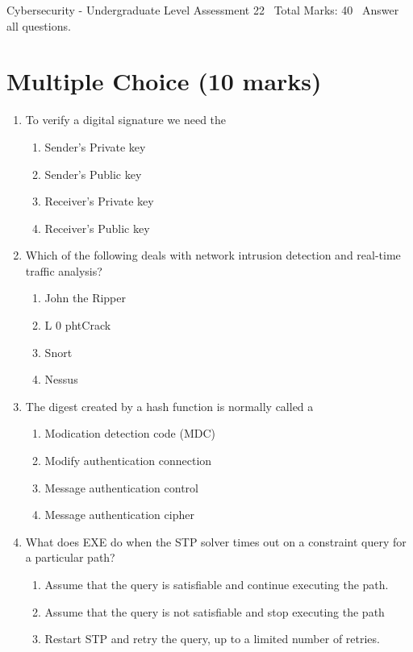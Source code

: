 \documentclass[12pt]{article}
\begin{document}
\begin{center}
Cybersecurity - Undergraduate Level Assessment 22 \
Total Marks: 40 \
Answer all questions.
\end{center}

\section*{Multiple Choice (10 marks)}
\begin{enumerate}[label=\arabic*.]
\item To verify a digital signature we need the
\begin{enumerate}[label=(\alph*)]
    \item Sender's Private key
    \item Sender's Public key
    \item Receiver's Private key
    \item Receiver's Public key
\end{enumerate}
\item Which of the following deals with network intrusion detection and real-time traffic analysis?
\begin{enumerate}[label=(\alph*)]
    \item John the Ripper
    \item L 0 phtCrack
    \item Snort
    \item Nessus
\end{enumerate}
\item The digest created by a hash function is normally called a
\begin{enumerate}[label=(\alph*)]
    \item Modication detection code (MDC)
    \item Modify authentication connection
    \item Message authentication control
    \item Message authentication cipher
\end{enumerate}
\item What does EXE do when the STP solver times out on a constraint query for a particular path?
\begin{enumerate}[label=(\alph*)]
    \item Assume that the query is satisfiable and continue executing the path.
    \item Assume that the query is not satisfiable and stop executing the path
    \item Restart STP and retry the query, up to a limited number of retries.

\end{enumerate}
\end{enumerate}
\end{document}
